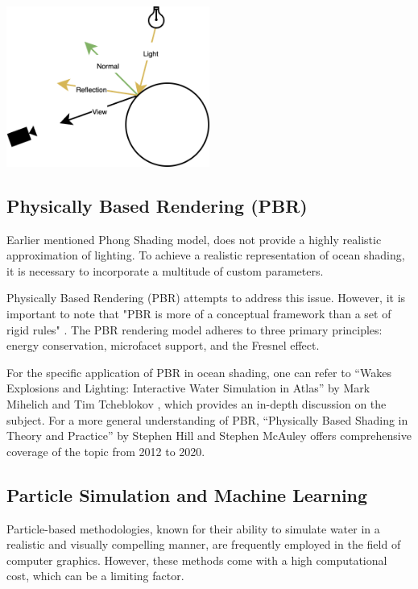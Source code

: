 \begin{minipage}{1\textwidth}
    \centering
    \includegraphics[width=0.5\textwidth]{"images/phong_graph.png"}
    \label{fig:phong_graph}
\end{minipage}

\subsection{Physically Based Rendering (PBR)}
Earlier mentioned Phong Shading model, does not provide a highly realistic approximation of lighting. To achieve a realistic representation of ocean shading, it is necessary to incorporate a multitude of custom parameters.

Physically Based Rendering (PBR) attempts to address this issue. However, it is important to note that "PBR is more of a conceptual framework than a set of rigid rules" \cite{wilson2017}. The PBR rendering model adheres to three primary principles: energy conservation, microfacet support, and the Fresnel effect.

For the specific application of PBR in ocean shading, one can refer to “Wakes Explosions and Lighting: Interactive Water Simulation in Atlas” by Mark Mihelich and Tim Tcheblokov \cite{mark2021}, which provides an in-depth discussion on the subject. For a more general understanding of PBR, “Physically Based Shading in Theory and Practice” by Stephen Hill and Stephen McAuley \cite{stephan2012} offers comprehensive coverage of the topic from 2012 to 2020.

\subsection{Particle Simulation and Machine Learning}
Particle-based methodologies, known for their ability to simulate water in a realistic and visually compelling manner, are frequently employed in the field of computer graphics. However, these methods come with a high computational cost, which can be a limiting factor.

